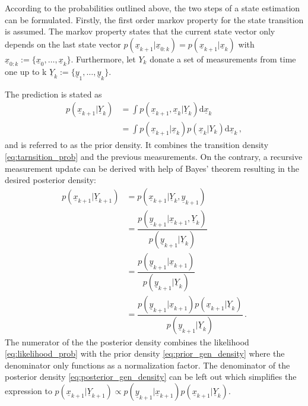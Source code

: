 \documentclass[a4paper]{IEEEtran}
\begin{document}
According to the probabilities outlined above, the two steps of a state estimation can be formulated. 
Firstly, the first order markov property for the state transition is assumed. The markov property states that the current state vector only depends on the last state vector 
$p(\underline{x}_{k+1} \vert \underline{x}_{0:k}) = p(\underline{x}_{k+1} \vert \underline{x}_{k})$ with $\underline{x}_{0:k} := \{\underline{x}_{0}, \dotsc, \underline{x}_{k}\}$.
Furthermore, let $Y_{k}$ donate a set of measurements from time one up to k $\underline{Y}_{k} := \{\underline{y}_{1}, \dotsc , \underline{y}_{k}\}$.

The prediction is stated as
\begin{equation}
    \begin{split}
        p(\underline{x}_{k+1} \vert \underline{Y}_{k}) &= \int p(\underline{x}_{k+1}, \underline{x}_{k} \vert \underline{Y}_{k}) \mathrm{d}\underline{x}_{k} \\
        &= \int p(\underline{x}_{k+1} \vert \underline{x}_{k})p(\underline{x}_{k} \vert Y_{k})\mathrm{d}\underline{x}_{k} \,,
    \end{split}
    \label{eq:prior_gen_density}
\end{equation}
and is referred to as the prior density. It combines the transition density \eqref{eq:tarnsition_prob} and the previous measurements.
On the contrary, a recursive measurement update can be derived with help of Bayes' theorem resulting in the desired posterior density:
\begin{equation}
    \begin{split}
        p(\underline{x}_{k+1} \vert \underline{Y}_{k+1}) &= p(\underline{x}_{k+1} \vert \underline{Y}_{k}, \underline{y}_{k+1}) \\
        &= \dfrac{p(\underline{y}_{k+1} \vert \underline{x}_{k+1}, \underline{Y}_{k})}{p(\underline{y}_{k+1} \vert \underline{Y}_{k})} \\
        &= \dfrac{p(\underline{y}_{k+1} \vert \underline{x}_{k+1})}{p(\underline{y}_{k+1} \vert \underline{Y}_{k})} \\
        &= \dfrac{p(\underline{y}_{k+1} \vert \underline{x}_{k+1}) p(\underline{x}_{k+1} \vert \underline{Y}_{k})}{p(\underline{y}_{k+1} \vert \underline{Y}_{k})} \,.  
        \label{eq:posterior_gen_density}
    \end{split}
\end{equation}
The numerator of the the posterior density combines the likelihood \eqref{eq:likelihood_prob} with the 
prior density \eqref{eq:prior_gen_density} where the denominator only functions as a normalization factor.
The denominator of the posterior density \eqref{eq:posterior_gen_density} can be left out which simplifies the expression to 
$ p(\underline{x}_{k+1} \vert \underline{Y}_{k+1}) \propto p(\underline{y}_{k+1} \vert \underline{x}_{k+1}) p(\underline{x}_{k+1} \vert \underline{Y}_{k})$.
\end{document}
